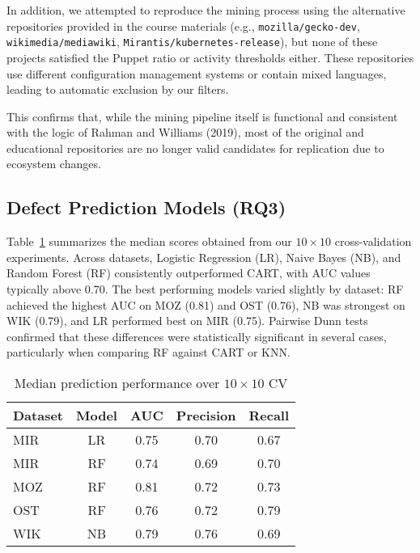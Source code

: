 \documentclass[conference]{IEEEtran}
\begin{document}
In addition, we attempted to reproduce the mining process using the alternative repositories provided in the course materials (e.g., \texttt{mozilla/gecko-dev}, \texttt{wikimedia/mediawiki}, \texttt{Mirantis/kubernetes-release}), but none of these projects satisfied the Puppet ratio or activity thresholds either. These repositories use different configuration management systems or contain mixed languages, leading to automatic exclusion by our filters.

This confirms that, while the mining pipeline itself is functional and consistent with the logic of Rahman and Williams (2019), most of the original and educational repositories are no longer valid candidates for replication due to ecosystem changes.

\subsection{Defect Prediction Models (RQ3)}
Table~\ref{tab:model-results} summarizes the median scores obtained from our $10 \times 10$ cross-validation experiments. 
Across datasets, Logistic Regression (LR), Naive Bayes (NB), and Random Forest (RF) consistently outperformed CART, with AUC values typically above 0.70. 
The best performing models varied slightly by dataset: RF achieved the highest AUC on MOZ (0.81) and OST (0.76), NB was strongest on WIK (0.79), and LR performed best on MIR (0.75). 
Pairwise Dunn tests confirmed that these differences were statistically significant in several cases, particularly when comparing RF against CART or KNN. 

\begin{table}[htbp]
	\caption{Median prediction performance over $10 \times 10$ CV}
	\label{tab:model-results}
	\centering
	\begin{tabular}{lcccc}
		\hline
		Dataset & Model & AUC & Precision & Recall \\
		\hline
		MIR & LR & 0.75 & 0.70 & 0.67 \\
		MIR & RF & 0.74 & 0.69 & 0.70 \\
		MOZ & RF & 0.81 & 0.72 & 0.73 \\
		OST & RF & 0.76 & 0.72 & 0.79 \\
		WIK & NB & 0.79 & 0.76 & 0.69 \\
		\hline
	\end{tabular}
\end{table}
\end{document}
